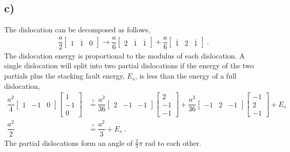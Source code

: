 \documentclass[a4paper]{article}
\begin{document}
	\subsection{c)}
	The dislocation can be decomposed as follows,
	\begin{align}
		\dfrac{a}{2}
		\begin{bmatrix}
		1 & \overline{1} & 0 
		\end{bmatrix}
		\to
		\dfrac{a}{6}
		\begin{bmatrix}
		2 & \overline{1} & \overline{1} 
		\end{bmatrix}
		+
		\dfrac{a}{6}
		\begin{bmatrix}
		\overline{1} & 2 & \overline{1} 
		\end{bmatrix}~.
	\end{align}
	The dislocation energy is proportional to the modulus of each dislocation. A single dislocation will split into two partial dislocations if the energy of the two partials plus the stacking fault energy, $E_{s}$, is less than the energy of a full dislocation,
	\begin{subequations}
	\begin{align}
		\dfrac{a^{2}}{4} 
		\begin{bmatrix}
			1 & -1 & 0 
		\end{bmatrix}
		\begin{bmatrix}
		1\\ -1\\ 0 
		\end{bmatrix} 
		&\overset{?}{=}
		\dfrac{a^{2}}{36}
		\begin{bmatrix}
		2 & -1 & -1
		\end{bmatrix}
		\begin{bmatrix}
		2 \\ -1 \\ -1
		\end{bmatrix}
		+
		\dfrac{a^{2}}{36}
		\begin{bmatrix}
		-1 & 2 & -1
		\end{bmatrix}
		\begin{bmatrix}
		-1\\ 2 \\ -1
		\end{bmatrix}
		+ E_{s}\\
		\dfrac{a^{2}}{2} &\overset{?}{=} \dfrac{a^{2}}{3} + E_{s}~.
	\end{align}
	\end{subequations}
	The partial dislocations form an angle of $\frac{2}{3}\pi$ rad to each other.
\end{document}
